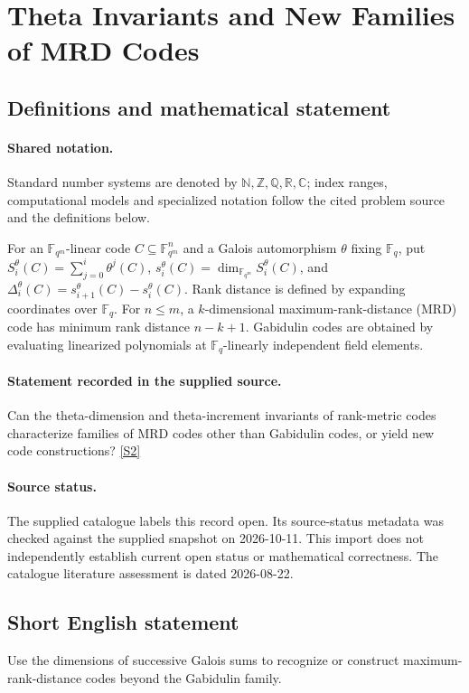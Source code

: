 \documentclass[11pt]{article}
\newcommand{\sref}[2]{\hyperlink{source:#1:#2}{[S#2]}}
\begin{document}
\section{Theta Invariants and New Families of MRD Codes}\label{statement}

\subsection{Definitions and mathematical statement}

\paragraph{Shared notation.}Standard number systems are denoted by $\mathbb N,\mathbb Z,\mathbb Q,\mathbb R,\mathbb C$; index ranges, computational models and specialized notation follow the cited problem source and the definitions below.


For an $\mathbb F_{q^m}$-linear code $C\subseteq\mathbb F_{q^m}^{n}$ and a Galois automorphism $\theta$ fixing $\mathbb F_q$, put $S_i^\theta(C)=\sum_{j=0}^{i}\theta^j(C)$, $s_i^\theta(C)=\dim_{\mathbb F_{q^m}}S_i^\theta(C)$, and $\Delta_i^\theta(C)=s_{i+1}^\theta(C)-s_i^\theta(C)$. Rank distance is defined by expanding coordinates over $\mathbb F_q$. For $n\leq m$, a $k$-dimensional maximum-rank-distance (MRD) code has minimum rank distance $n-k+1$. Gabidulin codes are obtained by evaluating linearized polynomials at $\mathbb F_q$-linearly independent field elements.
\paragraph{Statement recorded in the supplied source.}
Can the theta-dimension and theta-increment invariants of rank-metric codes characterize families of MRD codes other than Gabidulin codes, or yield new code constructions? \sref{statement}{2}
\paragraph{Source status.}
The supplied catalogue labels this record open. Its source-status metadata was checked against the supplied snapshot on 2026-10-11. This import does not independently establish current open status or mathematical correctness. The catalogue literature assessment is dated 2026-08-22.
\subsection{Short English statement}
Use the dimensions of successive Galois sums to recognize or construct maximum-rank-distance codes beyond the Gabidulin family.
\end{document}

